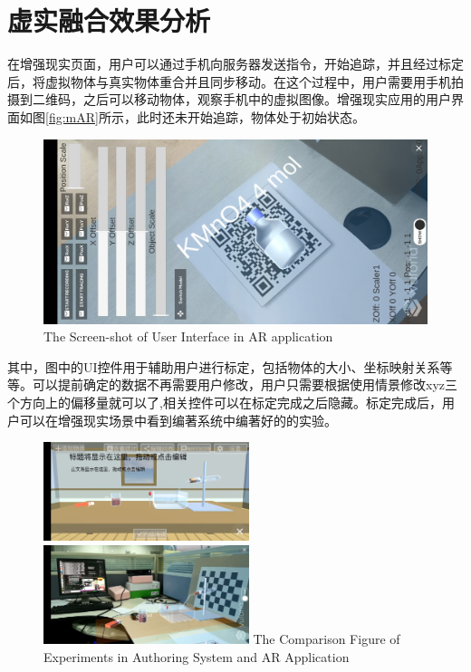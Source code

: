 \section{虚实融合效果分析}
在增强现实页面，用户可以通过手机向服务器发送指令，开始追踪，并且经过标定后，将虚拟物体与真实物体重合并且同步移动。在这个过程中，用户需要用手机拍摄到二维码，之后可以移动物体，观察手机中的虚拟图像。增强现实应用的用户界面如图\ref{fig:mAR}所示，此时还未开始追踪，物体处于初始状态。

\begin{figure}[!htp]
  \centering
  \includegraphics[width=12cm]{figure/ARui.jpg}
    {The Screen-shot of User Interface in AR application }
 \label{fig:ARUI}
\end{figure}

其中，图中的UI控件用于辅助用户进行标定，包括物体的大小、坐标映射关系等等。可以提前确定的数据不再需要用户修改，用户只需要根据使用情景修改xyz三个方向上的偏移量就可以了,相关控件可以在标定完成之后隐藏。标定完成后，用户可以在增强现实场景中看到编著系统中编著好的的实验。
\begin{figure}[!htp]
  \centering
  \includegraphics[width=6cm]{figure/authorRes.jpg}
    \hspace{1cm}
  \includegraphics[width=6cm]{figure/table.jpg}
    {The Comparison Figure of Experiments in Authoring System and AR Application}
 \label{fig:comp}
\end{figure}


